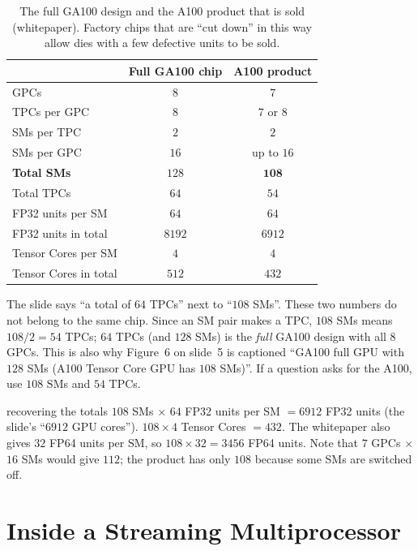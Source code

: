 \begin{table}[ht]
\centering\small
\begin{tabular}{@{}lcc@{}}
\toprule
 & \textbf{Full GA100 chip} & \textbf{A100 product}\\
\midrule
GPCs & $8$ & $7$\\
TPCs per GPC & $8$ & $7$ or $8$\\
SMs per TPC & $2$ & $2$\\
SMs per GPC & $16$ & up to $16$\\
\textbf{Total SMs} & $128$ & $\mathbf{108}$\\
Total TPCs & $64$ & $54$\\
FP32 units per SM & $64$ & $64$\\
FP32 units in total & $8192$ & $6912$\\
Tensor Cores per SM & $4$ & $4$\\
Tensor Cores in total & $512$ & $432$\\
\bottomrule
\end{tabular}
\caption{The full GA100 design and the A100 product that is sold (whitepaper). Factory chips that
are ``cut down'' in this way allow dies with a few defective units to be sold.}
\label{tab:a100counts}
\end{table}

\begin{pitfall}
The slide says ``a total of $64$ TPCs'' next to ``$108$ SMs''. These two numbers do not belong
to the same chip. Since an SM pair makes a TPC, $108$ SMs means $108/2=54$ TPCs; $64$ TPCs (and $128$ SMs) is the
\emph{full} GA100 design with all $8$ GPCs. This is also why Figure~6 on slide~5 is captioned
``GA100 full GPU with $128$ SMs (A100 Tensor Core GPU has $108$ SMs)''. If a question asks for the A100, use $108$ SMs and $54$ TPCs.
\end{pitfall}

\begin{workedex}{recovering the totals}
$108$ SMs $\times$ $64$ FP32 units per SM $=6912$ FP32 units (the slide's ``$6912$ GPU cores'').
$108\times4$ Tensor Cores $=432$. The whitepaper also gives $32$ FP64 units per SM, so $108\times32=3456$ FP64 units.
Note that $7$ GPCs $\times$ $16$ SMs would give $112$; the product has only $108$ because some SMs are switched off.
\end{workedex}

\section{Inside a Streaming Multiprocessor}

